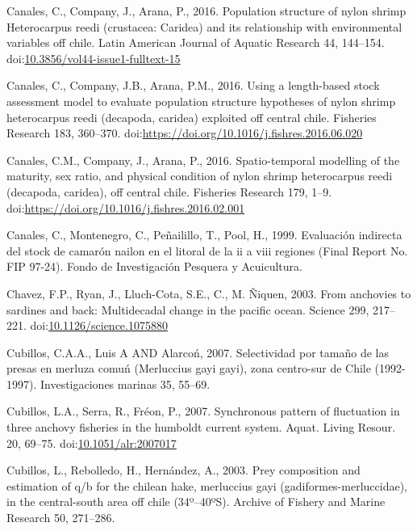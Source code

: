 \documentclass[12pt]{article}
\begin{document}
\leavevmode\hypertarget{ref-Canales2016aa}{}%
Canales, C., Company, J., Arana, P., 2016. Population structure of nylon
shrimp Heterocarpus reedi (crustacea: Caridea) and its relationship with
environmental variables off chile. Latin American Journal of Aquatic
Research 44, 144--154.
doi:\href{https://doi.org/10.3856/vol44-issue1-fulltext-15}{10.3856/vol44-issue1-fulltext-15}

\leavevmode\hypertarget{ref-CANALES2016360}{}%
Canales, C., Company, J.B., Arana, P.M., 2016. Using a length-based
stock assessment model to evaluate population structure hypotheses of
nylon shrimp heterocarpus reedi (decapoda, caridea) exploited off
central chile. Fisheries Research 183, 360--370.
doi:\href{https://doi.org/https://doi.org/10.1016/j.fishres.2016.06.020}{https://doi.org/10.1016/j.fishres.2016.06.020}

\leavevmode\hypertarget{ref-CANALES20161}{}%
Canales, C.M., Company, J., Arana, P., 2016. Spatio-temporal modelling
of the maturity, sex ratio, and physical condition of nylon shrimp
heterocarpus reedi (decapoda, caridea), off central chile. Fisheries
Research 179, 1--9.
doi:\href{https://doi.org/https://doi.org/10.1016/j.fishres.2016.02.001}{https://doi.org/10.1016/j.fishres.2016.02.001}

\leavevmode\hypertarget{ref-Canalesetal:1999}{}%
Canales, C., Montenegro, C., Peñailillo, T., Pool, H., 1999. Evaluación
indirecta del stock de camarón nailon en el litoral de la ii a viii
regiones (Final Report No. FIP 97-24). Fondo de Investigación Pesquera y
Acuicultura.

\leavevmode\hypertarget{ref-Chavez217}{}%
Chavez, F.P., Ryan, J., Lluch-Cota, S.E., C., M. Ñiquen, 2003. From
anchovies to sardines and back: Multidecadal change in the pacific
ocean. Science 299, 217--221.
doi:\href{https://doi.org/10.1126/science.1075880}{10.1126/science.1075880}

\leavevmode\hypertarget{ref-CUBILLOS2007}{}%
Cubillos, C.A.A., Luis A AND Alarcoń, 2007. Selectividad por tamaño de
las presas en merluza comuń (Merluccius gayi gayi), zona centro-sur de
Chile (1992-1997). Investigaciones marinas 35, 55--69.

\leavevmode\hypertarget{ref-Cubillos2007a}{}%
Cubillos, L.A., Serra, R., Fréon, P., 2007. Synchronous pattern of
fluctuation in three anchovy fisheries in the humboldt current system.
Aquat. Living Resour. 20, 69--75.
doi:\href{https://doi.org/10.1051/alr:2007017}{10.1051/alr:2007017}

\leavevmode\hypertarget{ref-Cubillosetal:2003mgayi}{}%
Cubillos, L., Rebolledo, H., Hernández, A., 2003. Prey composition and
estimation of q/b for the chilean hake, merluccius gayi
(gadiformes-merluccidae), in the central-south area off chile
(34º--40ºS). Archive of Fishery and Marine Research 50, 271--286.
\end{document}
